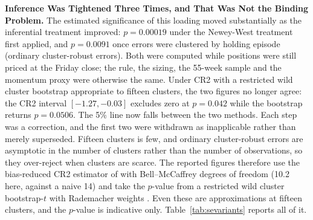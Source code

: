 \documentclass[11pt]{article}
\begin{document}
\textbf{Inference Was Tightened Three Times, and That Was Not the Binding Problem.} The estimated significance of this loading moved substantially as the inferential treatment improved: $p = 0.00019$ under the Newey-West treatment first applied, and $p = 0.0091$ once errors were clustered by holding episode (ordinary cluster-robust errors). Both were computed while positions were still priced at the Friday close; the rule, the sizing, the 55-week sample and the momentum proxy were otherwise the same. Under CR2 with a restricted wild cluster bootstrap appropriate to fifteen clusters, the two figures no longer agree: the CR2 interval $[-1.27, -0.03]$ excludes zero at $p = 0.042$ while the bootstrap returns $p = 0.0506$. The 5\% line now falls between the two methods. Each step was a correction, and the first two were withdrawn as inapplicable rather than merely superseded. Fifteen clusters is few, and ordinary cluster-robust errors are asymptotic in the number of clusters rather than the number of observations, so they over-reject when clusters are scarce. The reported figures therefore use the bias-reduced CR2 estimator of \citet{bell2002bias} with Bell--McCaffrey degrees of freedom (10.2 here, against a naive 14) and take the $p$-value from a restricted wild cluster bootstrap-$t$ with Rademacher weights \citep{cameron2008bootstrap}. Even these are approximations at fifteen clusters, and the $p$-value is indicative only. Table~\ref{tab:sevariants} reports all of it.
\end{document}
